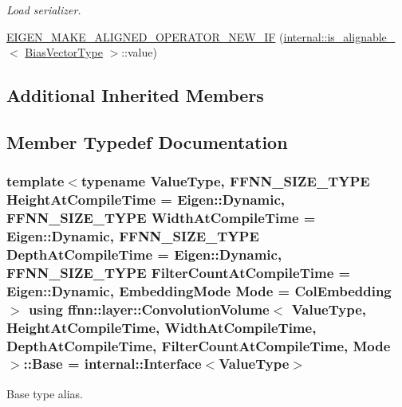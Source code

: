 \begin{DoxyCompactItemize}
\begin{DoxyCompactList}\small\item\em Load serializer. \end{DoxyCompactList}\item 
\hyperlink{classffnn_1_1layer_1_1_convolution_volume_a30a1ab41943208bc7655ae323f99d2e2}{E\-I\-G\-E\-N\-\_\-\-M\-A\-K\-E\-\_\-\-A\-L\-I\-G\-N\-E\-D\-\_\-\-O\-P\-E\-R\-A\-T\-O\-R\-\_\-\-N\-E\-W\-\_\-\-I\-F} (\hyperlink{structffnn_1_1layer_1_1internal_1_1is__alignable__128}{internal\-::is\-\_\-alignable\-\_}$<$ \hyperlink{classffnn_1_1layer_1_1_convolution_volume_ac2655aee05415e5ffc76cf7b0ba64e61}{Bias\-Vector\-Type} $>$\-::value)
\end{DoxyCompactItemize}
\subsection*{Additional Inherited Members}


\subsection{Member Typedef Documentation}
\hypertarget{classffnn_1_1layer_1_1_convolution_volume_aca83c6f7b34f8865682859f2e096858d}{
\subsubsection[{Base}]{\setlength{\rightskip}{0pt plus 5cm}template$<$typename Value\-Type, F\-F\-N\-N\-\_\-\-S\-I\-Z\-E\-\_\-\-T\-Y\-P\-E Height\-At\-Compile\-Time = Eigen\-::\-Dynamic, F\-F\-N\-N\-\_\-\-S\-I\-Z\-E\-\_\-\-T\-Y\-P\-E Width\-At\-Compile\-Time = Eigen\-::\-Dynamic, F\-F\-N\-N\-\_\-\-S\-I\-Z\-E\-\_\-\-T\-Y\-P\-E Depth\-At\-Compile\-Time = Eigen\-::\-Dynamic, F\-F\-N\-N\-\_\-\-S\-I\-Z\-E\-\_\-\-T\-Y\-P\-E Filter\-Count\-At\-Compile\-Time = Eigen\-::\-Dynamic, Embedding\-Mode Mode = Col\-Embedding$>$ using {\bf ffnn\-::layer\-::\-Convolution\-Volume}$<$ Value\-Type, Height\-At\-Compile\-Time, Width\-At\-Compile\-Time, Depth\-At\-Compile\-Time, Filter\-Count\-At\-Compile\-Time, Mode $>$\-::{\bf Base} =  {\bf internal\-::\-Interface}$<$Value\-Type$>$}}\label{classffnn_1_1layer_1_1_convolution_volume_aca83c6f7b34f8865682859f2e096858d}


Base type alias. 

